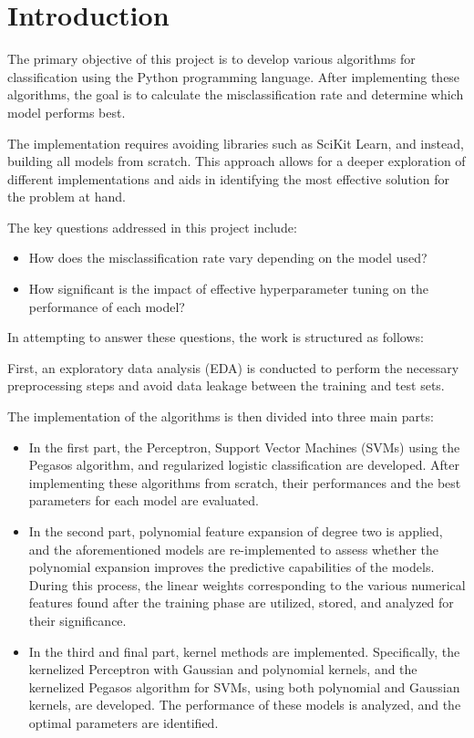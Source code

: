 \documentclass[a4paper, 10pt]{article}
\begin{document}
\tableofcontents

\newpage

\section*{Introduction}
The primary objective of this project is to develop various algorithms for classification using the Python programming language. After implementing these algorithms, the goal is to calculate the misclassification rate and determine which model performs best.

The implementation requires avoiding libraries such as SciKit Learn, and instead, building all models from scratch. This approach allows for a deeper exploration of different implementations and aids in identifying the most effective solution for the problem at hand.

The key questions addressed in this project include:
\begin{itemize}
    \item How does the misclassification rate vary depending on the model used?
    \item How significant is the impact of effective hyperparameter tuning on the performance of each model?
\end{itemize}

In attempting to answer these questions, the work is structured as follows:

First, an exploratory data analysis (EDA) is conducted to perform the necessary preprocessing steps and avoid data leakage between the training and test sets.

The implementation of the algorithms is then divided into three main parts:

\begin{itemize}
    \item In the first part, the Perceptron, Support Vector Machines (SVMs) using the Pegasos algorithm, and regularized logistic classification are developed. After implementing these algorithms from scratch, their performances and the best parameters for each model are evaluated.
    \item In the second part, polynomial feature expansion of degree two is applied, and the aforementioned models are re-implemented to assess whether the polynomial expansion improves the predictive capabilities of the models. During this process, the linear weights corresponding to the various numerical features found after the training phase are utilized, stored, and analyzed for their significance.
    \item In the third and final part, kernel methods are implemented. Specifically, the kernelized Perceptron with Gaussian and polynomial kernels, and the kernelized Pegasos algorithm for SVMs, using both polynomial and Gaussian kernels, are developed. The performance of these models is analyzed, and the optimal parameters are identified.
\end{itemize}
\end{document}
